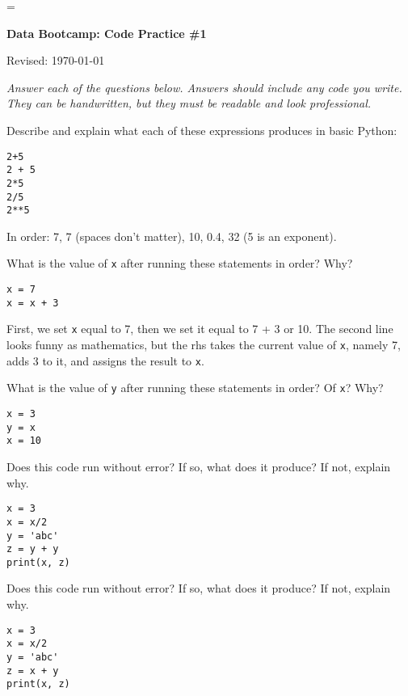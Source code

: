 \documentclass[11pt]{exam}
\begin{document}
\parskip=\bigskipamount
\parindent=0.0in
\thispagestyle{empty}


\bigskip\bigskip
\centerline{\Large \bf Data Bootcamp:  Code Practice \#1}
\centerline{Revised: \today}

{\it Answer each of the questions below.
Answers should include any code you write.
They can be handwritten, but they must be readable and look professional.}

\begin{questions}
\item Describe and explain what each of these expressions produces in basic Python:
\begin{verbatim}
2+5
2 + 5
2*5
2/5
2**5
\end{verbatim}

\begin{solution}
In order:  7, 7 (spaces don't matter), 10, 0.4, 32 (5 is an exponent).
\end{solution}

\item What is the value of \texttt{x} after running these statements in order? Why?
\begin{verbatim}
x = 7
x = x + 3
\end{verbatim}

\begin{solution}
First, we set {\tt x} equal to 7, then we set it equal to 7 + 3 or 10.
The second line looks funny as mathematics, but the rhs takes the current value of {\tt x}, namely 7,
adds 3 to it, and assigns the result to {\tt x}.
\end{solution}

\item What is the value of \texttt{y} after running these statements in order?
Of \texttt{x}?  Why?
\begin{verbatim}
x = 3
y = x
x = 10
\end{verbatim}

\item Does this code run without error?  If so, what does it produce?  If not, explain why.
\begin{verbatim}
x = 3
x = x/2
y = 'abc'
z = y + y
print(x, z)
\end{verbatim}

\item Does this code run without error?  If so, what does it produce?  If not, explain why.
\begin{verbatim}
x = 3
x = x/2
y = 'abc'
z = x + y
print(x, z)
\end{verbatim}


\end{questions}
\end{document}
